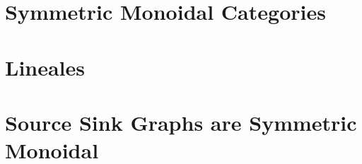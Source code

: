 \documentclass{llncs}
\begin{document}
\section{Symmetric Monoidal Categories}
\label{sec:symmetric_monoidal_categories}


\section{Lineales}
\label{sec:lineales}



\section{Source Sink Graphs are Symmetric Monoidal}
\label{sec:source_sink_graphs_are_symmetric_monoidal}

\end{document}
